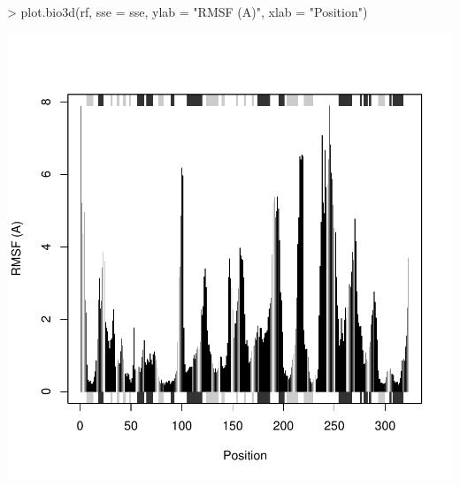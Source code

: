 \documentclass[a4paper]{article}
\begin{document}
\begin{center}
\begin{Schunk}
\begin{Sinput}
> plot.bio3d(rf, sse = sse, ylab = "RMSF (A)", xlab = "Position")
\end{Sinput}
\end{Schunk}
\includegraphics{figs/fig-026}
\end{center}
\end{document}
